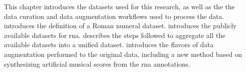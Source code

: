
This chapter introduces the datasets used for this research,
as well as the the data curation and data augmentation
workflows used to process the data.
 introduces the definition
of a Roman numeral dataset. 
introduces the publicly available datasets for \gls{rna}.
 describes the steps
followed to aggregate all the available datasets into a
unified dataset.  introduces the
flavors of data augmentation performed to the original data,
including a new method based on synthesizing artificial
musical scores from the \gls{rna} annotations.

